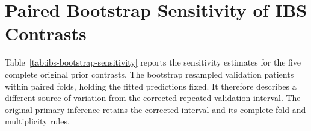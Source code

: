 \section{Paired Bootstrap Sensitivity of IBS Contrasts}

Table~\ref{tab:ibs-bootstrap-sensitivity} reports the sensitivity estimates for the five complete original prior contrasts. The bootstrap resampled validation patients within paired folds, holding the fitted predictions fixed. It therefore describes a different source of variation from the corrected repeated-validation interval. The original primary inference retains the corrected interval and its complete-fold and multiplicity rules.


